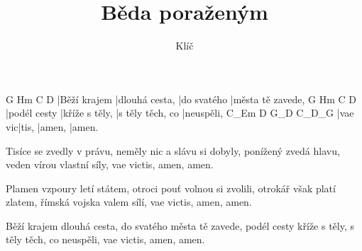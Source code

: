 \documentclass{song}
\title{Běda poraženým}
\author{Klíč}
\begin{document}
\strophe
G            Hm             C           D
|Běží krajem |dlouhá cesta, |do svatého |města tě zavede,
G            Hm             C                D
|podél cesty |kříže s těly, |s těly těch, co |neuspěli,
C_Em    D     G_D    C_D_G
|vae vic|tis, |amen, |amen.
\endstrophe

\strophe*
Tisíce se zvedly v právu, neměly nic a slávu si dobyly,
ponížený zvedá hlavu, veden vírou vlastní síly,
vae victis, amen, amen.
\endstrophe

\strophe*
Plamen vzpoury letí státem, otroci pouť volnou si zvolili,
otrokář však platí zlatem, římská vojska valem sílí,
vae victis, amen, amen.
\endstrophe

\strophe*
Běží krajem dlouhá cesta, do svatého města tě zavede,
podél cesty kříže s těly, s těly těch, co neuspěli,
vae victis, amen, amen.
\endstrophe
\end{document}
